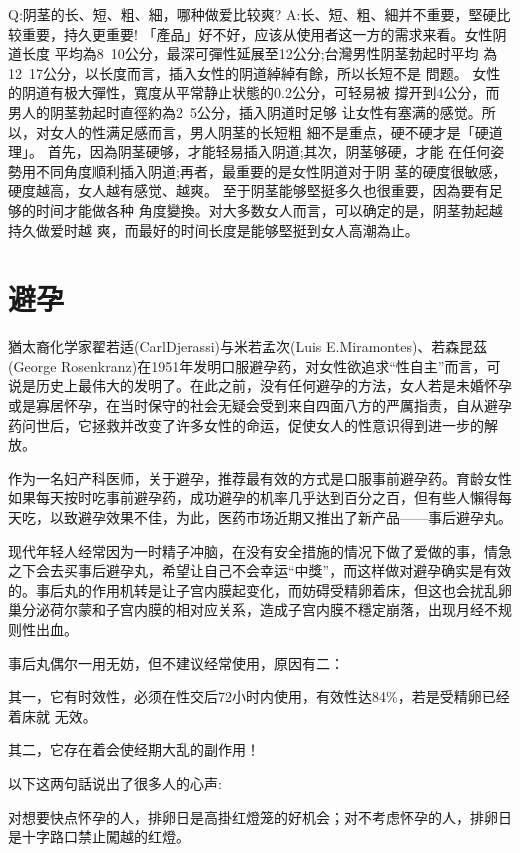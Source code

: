 \documentclass[12pt,UTF8]{ctexbook}
\begin{document}
Q:阴茎的长、短、粗、細，哪种做爱比较爽?
A:长、短、粗、細并不重要，堅硬比较重要，持久更重要!
「產品」好不好，应该从使用者这一方的需求来看。女性阴道长度
平均為8~10公分，最深可彈性延展至12公分;台灣男性阴茎勃起时平均
為12~17公分，以长度而言，插入女性的阴道綽綽有餘，所以长短不是
問题。
女性的阴道有极大彈性，寬度从平常静止状態的0.2公分，可轻易被
撐开到4公分，而男人的阴茎勃起时直徑約為2~5公分，插入阴道时足够
让女性有塞满的感觉。所以，对女人的性满足感而言，男人阴茎的长短粗
細不是重点，硬不硬才是「硬道理」。
首先，因為阴茎硬够，才能轻易插入阴道;其次，阴茎够硬，才能
在任何姿勢用不同角度順利插入阴道;再者，最重要的是女性阴道对于阴
茎的硬度很敏感，硬度越高，女人越有感觉、越爽。
至于阴茎能够堅挺多久也很重要，因為要有足够的时间才能做各种
角度變換。对大多数女人而言，可以确定的是，阴茎勃起越持久做爱时越
爽，而最好的时间长度是能够堅挺到女人高潮為止。



\chapter{避孕}

猶太裔化学家翟若适(CarlDjerassi)与米若孟次(Luis E.Miramontes)、若森昆茲(George Rosenkranz)在1951年发明口服避孕药，对女性欲追求“性自主”而言，可说是历史上最伟大的发明了。在此之前，没有任何避孕的方法，女人若是未婚怀孕或是寡居怀孕，在当时保守的社会无疑会受到来自四面八方的严厲指责，自从避孕药问世后，它拯救并改变了许多女性的命运，促使女人的性意识得到进一步的解放。

作为一名妇产科医师，关于避孕，推荐最有效的方式是口服事前避孕药。育龄女性如果每天按时吃事前避孕药，成功避孕的机率几乎达到百分之百，但有些人懶得每天吃，以致避孕效果不佳，为此，医药市场近期又推出了新产品——事后避孕丸。

现代年轻人经常因为一时精子冲脑，在没有安全措施的情况下做了爱做的事，情急之下会去买事后避孕丸，希望让自己不会幸运“中獎”，而这样做对避孕确实是有效的。事后丸的作用机转是让子宫内膜起变化，而妨碍受精卵着床，但这也会扰乱卵巢分泌荷尔蒙和子宫内膜的相对应关系，造成子宫内膜不穩定崩落，出现月经不规则性出血。

事后丸偶尔一用无妨，但不建议经常使用，原因有二：

其一，它有时效性，必须在性交后72小时内使用，有效性达84\%，若是受精卵已经着床就
无效。

其二，它存在着会使经期大乱的副作用！

以下这两句話说出了很多人的心声:

对想要快点怀孕的人，排卵日是高掛红燈笼的好机会；对不考虑怀孕的人，排卵日是十字路口禁止闖越的红燈。
\end{document}
